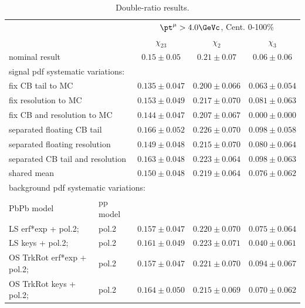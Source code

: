 \begin{table}[!h]
  \centering
  \caption{Double-ratio results.}
  \begin{tabular}{ll|c|c|c}
    \hline
\multicolumn{2}{c|}{} &\multicolumn{3}{c}{$\pt^\mu>4.0\GeVc$, Cent. 0-100\%} \\ 
\multicolumn{2}{c|}{} &       $\chi_{23}$       &       $\chi_{2}$        &     $\chi_{3}$    \\
\hline
\multicolumn{2}{l|}{nominal result}                    & $0.15\pm 0.05$  & $0.21\pm 0.07$  &  $0.06\pm 0.06$   \\
\hline \hline
\multicolumn{4}{l}{signal pdf systematic variations:} \\
\multicolumn{2}{l|}{fix CB tail to MC}                 & $0.135\pm 0.047$  & $0.200\pm 0.066$    &  $0.063\pm 0.054$ \\
\multicolumn{2}{l|}{fix resolution to MC}              & $0.153\pm 0.049$  & $0.217\pm 0.070$    &  $0.081\pm 0.063$ \\
\multicolumn{2}{l|}{fix CB and resolution to MC}       & $0.144\pm 0.047$  & $0.207\pm 0.067$    &  $0.000\pm 0.000$ \\ 
\multicolumn{2}{l|}{separated floating CB tail}        & $0.166\pm 0.052$  & $0.226\pm 0.070$    &  $0.098\pm 0.058$ \\
\multicolumn{2}{l|}{separated floating resolution}     & $0.149\pm 0.048$  & $0.215\pm 0.070$    &  $0.080\pm 0.064$ \\
\multicolumn{2}{l|}{separated CB tail and resolution}  & $0.163\pm 0.048$  & $0.223\pm 0.064$    &  $0.098\pm 0.063$ \\
\multicolumn{2}{l|}{shared mean}                       & $0.150\pm 0.048$  & $0.219\pm 0.064$    &  $0.076\pm 0.062$ \\
\hline \hline
\multicolumn{4}{l}{background pdf systematic variations:} \\
PbPb model & pp model & & & \\
LS erf*exp + pol.2;     & pol.2 & $0.157\pm0.047$ & $0.220\pm0.070$  &  $0.075\pm 0.064$ \\
LS keys + pol.2;        & pol.2 & $0.161\pm0.049$ & $0.223\pm0.071$  &  $0.040\pm 0.061$ \\
OS TrkRot erf*exp + pol.2; & pol.2 & $0.157\pm0.047$ & $0.221\pm0.070$  &  $0.094\pm 0.067$ \\
OS TrkRot keys + pol.2;    & pol.2 & $0.164\pm0.050$ & $0.215\pm0.069$  &  $0.070\pm 0.062$ \\

\end{tabular}
\end{table}
